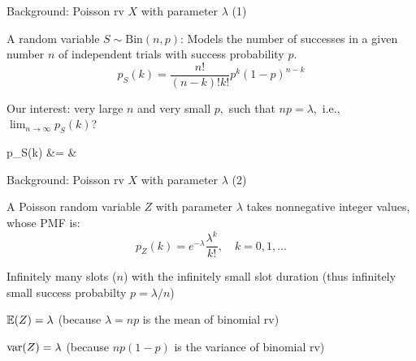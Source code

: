 \begin{frame}{Background: Poisson rv $X$ with parameter $\lambda$ (1)}


\plitemsep 0.05in
\bci 
\item<1-> A random variable $S \sim \text{Bin}(n,p)$: Models the number of successes in a given number $n$ of independent trials with success probability $p.$
$$
    p_S(k)=\frac{n!}{(n-k)! k!} p^k(1-p)^{n-k}
$$


\item<2-> Our interest: very large $n$ and very small
  $p,$ such that $np =\lambda,$ i.e.,  $\displaystyle \lim_{n \rightarrow \infty} p_S(k)$?

  \aleq
  {
    p_S(k) &=  \cr
    &  
  }


\eci 

\end{frame}

\begin{frame}{Background: Poisson rv $X$ with parameter $\lambda$ (2)}

\plitemsep 0.2in
\bci 
\item<2-> A Poisson random variable $Z$ with parameter $\lambda$ takes
  nonnegative integer values, whose PMF is:
  $$
  p_Z(k) =e^{-\lambda}\frac{\lambda^k}{k!}, \quad k=0,1, \ldots
  $$
  


\item<3-> Infinitely many slots ($n$) with the infinitely small slot
  duration (thus infinitely small success probabilty $p = \lambda/n$)

\item<4-> $\mathbb{E}( Z ) = \lambda$ (because $\lambda = np$ is the mean of
  binomial rv)

\item<5-> $\text{var}( Z ) = \lambda$ (because $np(1-p)$ is the variance of
  binomial rv)

  \eci 

\end{frame}

